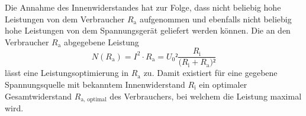Die Annahme des Innenwiderstandes hat zur Folge, dass nicht beliebig hohe Leistungen von dem Verbraucher $R_\text{a}$ aufgenommen und ebenfalls nicht beliebig hohe Leistungen von dem Spannungsgerät geliefert werden können. 
Die an den Verbraucher $R_\text{a}$ abgegebene Leistung 
\begin{equation}
N(R_\text{a}) = I^2\cdot R_\text{a}=U_0²\frac{R_\mathup{i}}{\bigl(R_\mathup{i}+R_\mathup{a}\bigr)²}
\label{eq:leistungsanpassung}
\end{equation}
 lässt eine Leistungsoptimierung in $R_\text{a}$ zu. 
Damit existiert für eine gegebene Spannungsquelle mit bekanntem Innenwiderstand $R_\text{i}$ ein optimaler Gesamtwiderstand $R_\text{a, optimal}$ des Verbrauchers,
bei welchem die Leistung maximal wird.
